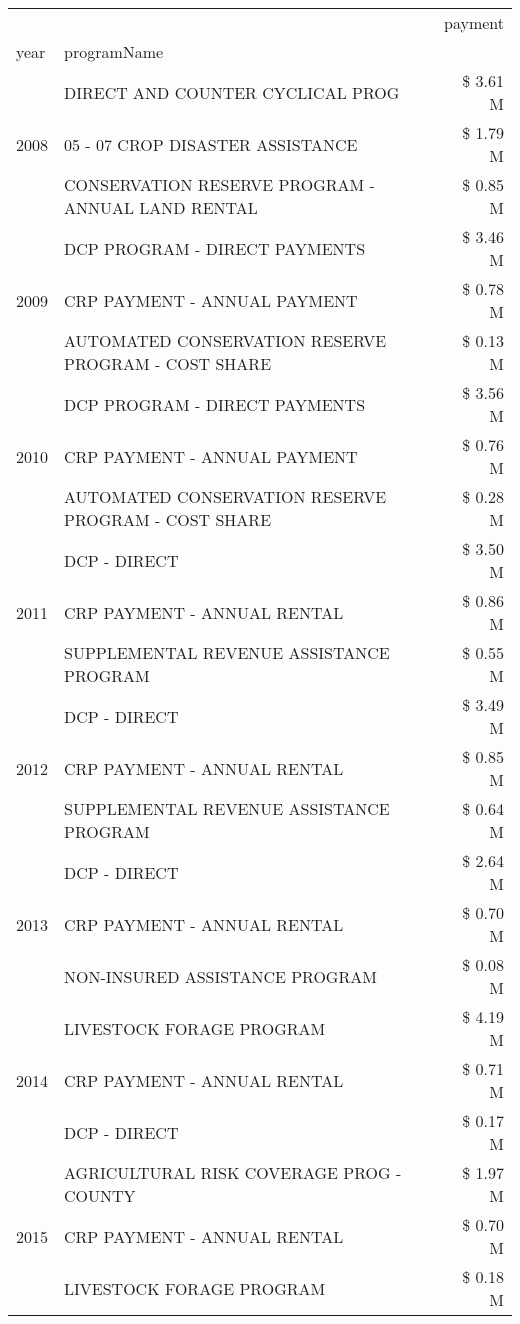 \begin{tabular}{llr}
\toprule
 &  & payment \\
year & programName &  \\
\midrule
\multirow[t]{3}{*}{2008} & DIRECT AND COUNTER CYCLICAL PROG & \$ 3.61 M \\
 & 05 - 07 CROP DISASTER ASSISTANCE & \$ 1.79 M \\
 & CONSERVATION RESERVE PROGRAM - ANNUAL LAND RENTAL & \$ 0.85 M \\
\cline{1-3}
\multirow[t]{3}{*}{2009} & DCP PROGRAM - DIRECT PAYMENTS & \$ 3.46 M \\
 & CRP PAYMENT - ANNUAL PAYMENT & \$ 0.78 M \\
 & AUTOMATED CONSERVATION RESERVE PROGRAM - COST SHARE & \$ 0.13 M \\
\cline{1-3}
\multirow[t]{3}{*}{2010} & DCP PROGRAM - DIRECT PAYMENTS & \$ 3.56 M \\
 & CRP PAYMENT - ANNUAL PAYMENT & \$ 0.76 M \\
 & AUTOMATED CONSERVATION RESERVE PROGRAM - COST SHARE & \$ 0.28 M \\
\cline{1-3}
\multirow[t]{3}{*}{2011} & DCP - DIRECT & \$ 3.50 M \\
 & CRP PAYMENT - ANNUAL RENTAL & \$ 0.86 M \\
 & SUPPLEMENTAL REVENUE ASSISTANCE PROGRAM & \$ 0.55 M \\
\cline{1-3}
\multirow[t]{3}{*}{2012} & DCP - DIRECT & \$ 3.49 M \\
 & CRP PAYMENT - ANNUAL RENTAL & \$ 0.85 M \\
 & SUPPLEMENTAL REVENUE ASSISTANCE PROGRAM & \$ 0.64 M \\
\cline{1-3}
\multirow[t]{3}{*}{2013} & DCP - DIRECT & \$ 2.64 M \\
 & CRP PAYMENT - ANNUAL RENTAL & \$ 0.70 M \\
 & NON-INSURED ASSISTANCE PROGRAM & \$ 0.08 M \\
\cline{1-3}
\multirow[t]{3}{*}{2014} & LIVESTOCK FORAGE PROGRAM & \$ 4.19 M \\
 & CRP PAYMENT - ANNUAL RENTAL & \$ 0.71 M \\
 & DCP - DIRECT & \$ 0.17 M \\
\cline{1-3}
\multirow[t]{3}{*}{2015} & AGRICULTURAL RISK COVERAGE PROG - COUNTY & \$ 1.97 M \\
 & CRP PAYMENT - ANNUAL RENTAL & \$ 0.70 M \\
 & LIVESTOCK FORAGE PROGRAM & \$ 0.18 M \\

\end{tabular}
